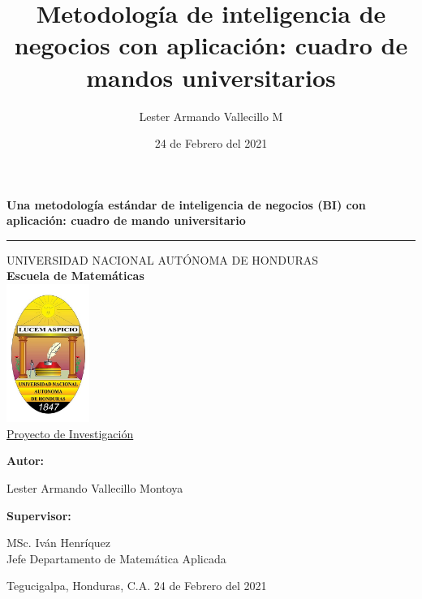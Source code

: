 \documentclass[11pt,titlepage]{report}
\title{Metodología de inteligencia de negocios con aplicación: cuadro de mandos universitarios}
\author{Lester Armando Vallecillo M}
\date{24 de Febrero del 2021}
\begin{document}
	
\begin{titlepage}
  \vspace*{1cm}
\begin{center}
\huge{\textbf{Una metodología estándar de inteligencia de negocios (BI) con aplicación: cuadro de mando universitario}}
\end{center}
\hrule

 \begin{center}
	{\LARGE{UNIVERSIDAD NACIONAL AUTÓNOMA DE HONDURAS}}\\
	{\LARGE \textbf{Escuela de Matemáticas}}\\[0.4cm] 
	\includegraphics[height=4.5cm]{Figuras/UNAH}\\[0.3cm]
 	{\LARGE\underline{Proyecto de Investigación}}\\ 
 \end{center}
\begin{center}
	\begin{list}{}{}
	\item \begin{center}
		\textbf{Autor:}
	\end{center}
	\item \begin{center}
		Lester Armando Vallecillo Montoya
	\end{center}
	\item \begin{center}
		\textbf{Supervisor:}
	\end{center}
	\item \begin{center}
		MSc. Iván Henríquez\\
		Jefe Departamento de Matemática Aplicada\\[1.6cm]
	\end{center}
\end{list}
\end{center}
   {\large Tegucigalpa, Honduras, C.A. \hfill 24 de Febrero del 2021}
\end{titlepage}
\end{document}
